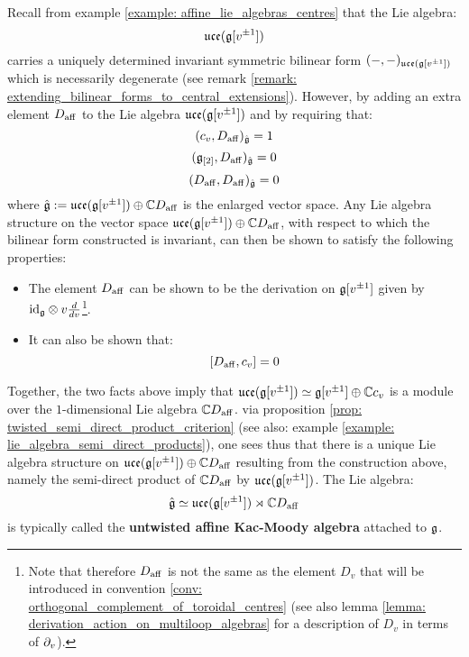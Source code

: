         Recall from example \ref{example: affine_lie_algebras_centres} that the Lie algebra:
            $$\mathfrak{uce}(\mathfrak{g}[v^{\pm 1}])$$
        carries a uniquely determined invariant symmetric bilinear form $(-, -)_{\mathfrak{uce}(\mathfrak{g}[v^{\pm 1}])}$ which is necessarily degenerate (see remark \ref{remark: extending_bilinear_forms_to_central_extensions}). However, by adding an extra element $D_{\mathrm{aff}}$ to the Lie algebra $\mathfrak{uce}(\mathfrak{g}[v^{\pm 1}])$ and by requiring that:
            $$(c_v, D_{\mathrm{aff}})_{\hat{\mathfrak{g}}} = 1$$
            $$(\mathfrak{g}_{[2]}, D_{\mathrm{aff}})_{\hat{\mathfrak{g}}} = 0$$
            $$(D_{\mathrm{aff}}, D_{\mathrm{aff}})_{\hat{\mathfrak{g}}} = 0$$
        where $\hat{\mathfrak{g}} := \mathfrak{uce}(\mathfrak{g}[v^{\pm 1}]) \oplus \mathbb{C} D_{\mathrm{aff}}$ is the enlarged vector space. Any Lie algebra structure on the vector space $\mathfrak{uce}(\mathfrak{g}[v^{\pm 1}]) \oplus \mathbb{C} D_{\mathrm{aff}}$, with respect to which the bilinear form constructed is invariant, can then be shown to satisfy the following properties:
        \begin{itemize}
            \item The element $D_{\mathrm{aff}}$ can be shown to be the derivation on $\mathfrak{g}[v^{\pm 1}]$ given by $\id_{\g} \tensor v \frac{d}{dv}$\footnote{Note that therefore $D_{\mathrm{aff}}$ is not the same as the element $D_v$ that will be introduced in convention \ref{conv: orthogonal_complement_of_toroidal_centres} (see also lemma \ref{lemma: derivation_action_on_multiloop_algebras} for a description of $D_v$ in terms of $\partial_v$).}.
            \item It can also be shown that:
                $$[D_{\mathrm{aff}}, c_v] = 0$$
        \end{itemize}
        Together, the two facts above imply that $\mathfrak{uce}(\mathfrak{g}[v^{\pm 1}]) \simeq \mathfrak{g}[v^{\pm 1}] \oplus \mathbb{C} c_v$ is a module over the $1$-dimensional Lie algebra $\mathbb{C} D_{\mathrm{aff}}$. via proposition \ref{prop: twisted_semi_direct_product_criterion} (see also: example \ref{example: lie_algebra_semi_direct_products}), one sees thus that there is a unique Lie algebra structure on $\mathfrak{uce}(\mathfrak{g}[v^{\pm 1}]) \oplus \mathbb{C} D_{\mathrm{aff}}$ resulting from the construction above, namely the semi-direct product of $\mathbb{C} D_{\mathrm{aff}}$ by $\mathfrak{uce}(\mathfrak{g}[v^{\pm 1}])$. The Lie algebra:
            $$\hat{\mathfrak{g}} \simeq \mathfrak{uce}(\mathfrak{g}[v^{\pm 1}]) \rtimes \mathbb{C} D_{\mathrm{aff}}$$
        is typically called the \textbf{untwisted affine Kac-Moody algebra} attached to $\mathfrak{g}$.

